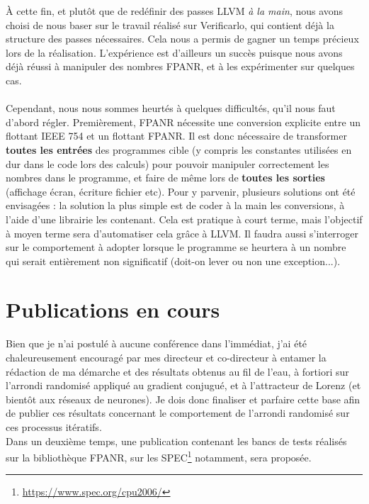 \documentclass[a4paper,11pt]{article}
\begin{document}
À cette fin, et plutôt que de redéfinir des passes LLVM \textit{à la main}, nous avons choisi de nous baser sur le travail réalisé sur Verificarlo, qui contient déjà la structure des passes nécessaires.
Cela nous a permis de gagner un temps précieux lors de la réalisation.
L’expérience est d'ailleurs un succès puisque nous avons déjà réussi à manipuler des nombres FPANR, et à les expérimenter sur quelques cas.\\
\\
Cependant, nous nous sommes heurtés à quelques difficultés, qu'il nous faut d'abord régler.
Premièrement, FPANR nécessite une conversion explicite entre un flottant IEEE 754 et un flottant FPANR. Il est donc nécessaire de transformer \textbf{toutes les entrées} des programmes cible (y compris les constantes utilisées en dur dans le code lors des calculs) pour pouvoir manipuler correctement les nombres dans le programme, et faire de même lors de \textbf{toutes les sorties} (affichage écran, écriture fichier etc). 
Pour y parvenir, plusieurs solutions ont été envisagées : la solution la plus simple est de coder à la main les conversions, à l’aide d’une librairie les contenant. Cela est pratique à court terme, mais l’objectif à moyen terme sera d’automatiser cela grâce à LLVM.
Il faudra aussi s’interroger sur le comportement à adopter lorsque le programme se heurtera à un nombre qui serait entièrement non significatif (doit-on lever ou non une exception...).


\section{Publications en cours}
Bien que je n'ai postulé à aucune conférence dans l'immédiat, j'ai été chaleureusement encouragé par mes directeur et co-directeur à entamer la rédaction de ma démarche et des résultats obtenus au fil de l'eau, à fortiori sur l'arrondi randomisé appliqué au gradient conjugué, et à l'attracteur de Lorenz (et bientôt aux réseaux de neurones). Je dois donc finaliser et parfaire cette base afin de publier ces résultats concernant le comportement de l'arrondi randomisé sur ces processus itératifs.
\\
Dans un deuxième temps, une publication contenant les bancs de tests réalisés sur la bibliothèque FPANR, sur les SPEC\footnote{\url{https://www.spec.org/cpu2006/}} notamment, sera proposée.
\end{document}
